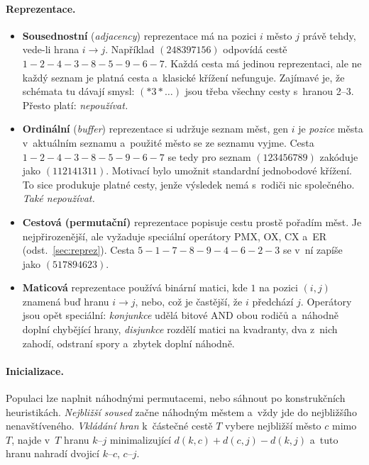 \documentclass[11pt,a4paper]{article}
\theoremstyle{definition}
\begin{document}
\paragraph{Reprezentace.}
\begin{itemize}
\item \textbf{Sousednostní} (\emph{adjacency}) reprezentace má na pozici $i$ město $j$
  právě tehdy, vede-li hrana $i \to j$. Například $(248397156)$ odpovídá cestě
  $1{-}2{-}4{-}3{-}8{-}5{-}9{-}6{-}7$. Každá cesta má jedinou reprezentaci,
  ale ne každý seznam je platná cesta a~klasické křížení nefunguje.
  Zajímavé je, že schémata tu dávají smysl: $(*3*\ldots)$ jsou třeba všechny cesty
  s~hranou 2--3. Přesto platí: \emph{nepoužívat.}
\item \textbf{Ordinální} (\emph{buffer}) reprezentace si udržuje seznam měst, gen $i$ je
  \emph{pozice} města v~aktuálním seznamu a~použité město se ze seznamu
  vyjme. Cesta $1{-}2{-}4{-}3{-}8{-}5{-}9{-}6{-}7$ se tedy pro seznam
  $(123456789)$ zakóduje jako $(112141311)$. Motivací bylo umožnit standardní
  jednobodové křížení. To sice produkuje platné cesty, jenže výsledek nemá
  s~rodiči nic společného. \emph{Také nepoužívat.}
\item \textbf{Cestová (permutační)} reprezentace popisuje cestu prostě pořadím
  měst. Je nejpřirozenější, ale vyžaduje speciální operátory PMX, OX, CX
  a~ER (odst.~\ref{sec:reprez}). Cesta $5{-}1{-}7{-}8{-}9{-}4{-}6{-}2{-}3$
  se v~ní zapíše jako $(517894623)$.
\item \textbf{Maticová} reprezentace používá binární matici, kde $1$ na pozici $(i,j)$
  znamená buď hranu $i \to j$, nebo, což je častější, že $i$ předchází $j$. Operátory jsou
  opět speciální: \emph{konjunkce} udělá bitové AND obou rodičů a~náhodně doplní chybějící
  hrany, \emph{disjunkce} rozdělí matici na kvadranty, dva z~nich zahodí, odstraní spory
  a~zbytek doplní náhodně.
\end{itemize}

\paragraph{Inicializace.} Populaci lze naplnit náhodnými permutacemi, nebo sáhnout po
konstrukčních heuristikách. \emph{Nejbližší soused} začne náhodným městem a~vždy jde do
nejbližšího nenavštíveného. \emph{Vkládání hran} k~částečné cestě $T$ vybere nejbližší
město $c$ mimo $T$, najde v~$T$ hranu $k$--$j$ minimalizující
$d(k,c) + d(c,j) - d(k,j)$ a~tuto hranu nahradí dvojicí $k$--$c$, $c$--$j$.
\end{document}
